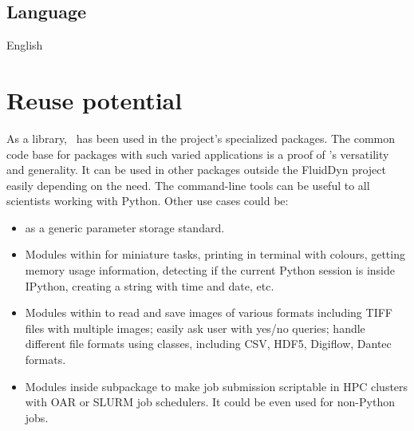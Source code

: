 \subsection{Language}


English

\section{Reuse potential}
%
%

As a library, \fluiddyn\ has been used in the project's specialized packages.
The common code base for packages with such varied applications is a proof of
\fluiddyn's versatility and generality. It can be used in other packages outside
the FluidDyn project easily depending on the need. The command-line tools can
be useful to all scientists working with Python. Other use cases could be:
\begin{itemize}
	\item {} as a generic parameter storage
		standard.
	\item Modules within  for miniature tasks,
		printing in terminal with colours, getting memory usage
		information, detecting if the current Python session is inside
		IPython, creating a string with time and date, etc.
	\item Modules within  to read
		and save images of various formats including TIFF files with
		multiple images; easily ask user with yes/no queries; handle
		different file formats using classes, including CSV, HDF5,
		Digiflow, Dantec formats.
	\item Modules inside  subpackage to
		make job submission scriptable in HPC clusters with OAR or
		SLURM job schedulers. It could be even used for non-Python
		jobs.
\end{itemize}



